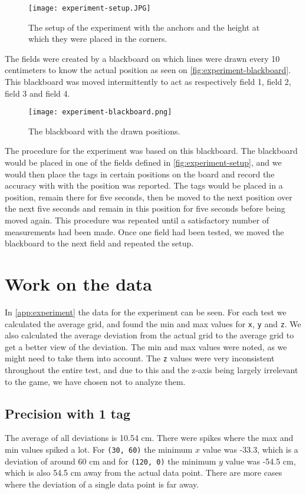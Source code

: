 \begin{figure}[H]
    \centering
    \texttt{[image: experiment-setup.JPG]}
    \caption{The setup of the experiment with the anchors and the height at which they were placed in the corners.}
    \label{fig:experiment-setup}
\end{figure}
\noindent
The fields were created by a blackboard on which lines were drawn every 10 centimeters to know the actual position as seen on \autoref{fig:experiment-blackboard}.
This blackboard was moved intermittently to act as respectively field 1, field 2, field 3 and field 4.

\begin{figure}[H]
    \centering
    \texttt{[image: experiment-blackboard.png]}
    \caption{The blackboard with the drawn positions.}
    \label{fig:experiment-blackboard}
\end{figure}
\noindent
The procedure for the experiment was based on this blackboard.
The blackboard would be placed in one of the fields defined in \autoref{fig:experiment-setup}, and we would then place the tags in certain positions on the board and record the accuracy with with the position was reported.
The tags would be placed in a position, remain there for five seconds, then be moved to the next position over the next five seconds and remain in this position for five seconds before being moved again.
This procedure was repeated until a satisfactory number of measurements had been made.
Once one field had been tested, we moved the blackboard to the next field and repeated the setup.
 
\section{Work on the data}
In \autoref{app:experiment} the data for the experiment can be seen.
For each test we calculated the average grid, and found the min and max values for \texttt{x}, \texttt{y} and \texttt{z}.
We also calculated the average deviation from the actual grid to the average grid to get a better view of the deviation.
The min and max values were noted, as we might need to take them into account. 
The \texttt{z} values were very inconsistent throughout the entire test, and due to this and the z-axis being largely irrelevant to the game, we have chosen not to analyze them.

\subsection{Precision with 1 tag} 
The average of all deviations is 10.54 cm.
There were spikes where the max and min values spiked a lot.
For \texttt{(30, 60)} the minimum $x$ value was -33.3, which is a deviation of around 60 cm and for \texttt{(120, 0)} the minimum $y$ value was -54.5 cm, which is also 54.5 cm away from the actual data point.
There are more cases where the deviation of a single data point is far away. 

